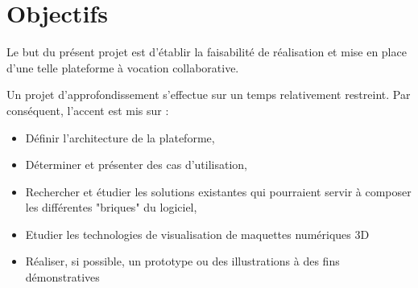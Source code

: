 \section{Objectifs}

Le but du présent projet est d'établir la faisabilité de réalisation et mise en place d'une telle plateforme à vocation collaborative.

Un projet d'approfondissement s'effectue sur un temps relativement restreint. Par conséquent, l'accent est mis sur :


\begin{itemize}
    \item Définir l'architecture de la plateforme,
    \item Déterminer et présenter des cas d'utilisation,
    \item Rechercher et étudier les solutions existantes qui pourraient servir à composer les différentes "briques" du logiciel,
    \item Etudier les technologies de visualisation de maquettes numériques 3D
    \item Réaliser, si possible, un prototype ou des illustrations à des fins démonstratives
\end{itemize}
